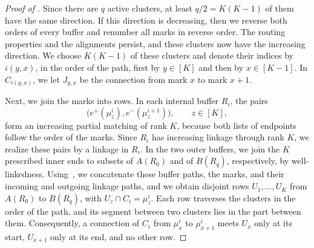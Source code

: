 \documentclass[fontsize=12pt,leading=14pt]{fullpaper}
\begin{document}
\begin{proof}[Proof of ]
  Since there are $q$ active clusters, at least $q/2=K(K-1)$ of them have the same direction.
  If this direction is decreasing, then we reverse both orders of every buffer and renumber all marks in reverse order.
  The routing properties and the alignments persist, and these clusters now have the increasing direction.
  We choose $K(K-1)$ of these clusters and denote their indices by $i(y,x)$, in the order of the path, first by $y\in[K]$ and then by $x\in[K-1]$.
  In $C_{i(y,x)}$, we let $J_{y,x}$ be the connection from mark $x$ to mark $x+1$.

  Next, we join the marks into rows.
  In each internal buffer $R_i$, the pairs
  \[
    \bigl(e^+(\mu^i_z),e^-(\mu^{i+1}_z)\bigr),\qquad z\in[K],
  \]
  form an increasing partial matching of rank $K$, because both lists of endpoints follow the order of the marks.
  Since $R_i$ has increasing linkage through rank $K$, we realize these pairs by a linkage in $R_i$.
  In the two outer buffers, we join the $K$ prescribed inner ends to subsets of $A(R_0)$ and of $B(R_q)$, respectively, by well-linkedness.
  Using~, we concatenate these buffer paths, the marks, and their incoming and outgoing linkage paths, and we obtain disjoint rows $U_1,\dots,U_K$ from $A(R_0)$ to $B(R_q)$, with $U_z\cap C_i=\mu^i_z$.
  Each row traverses the clusters in the order of the path, and its segment between two clusters lies in the part between them.
  Consequently, a connection of $C_i$ from $\mu^i_x$ to $\mu^i_{x+1}$ meets $U_x$ only at its start, $U_{x+1}$ only at its end, and no other row.


\end{proof}
\end{document}
